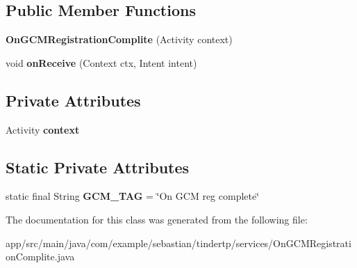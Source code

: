 \subsection*{Public Member Functions}
\begin{DoxyCompactItemize}
\item 
{\bfseries On\+G\+C\+M\+Registration\+Complite} (Activity context)\hypertarget{classcom_1_1example_1_1sebastian_1_1tindertp_1_1services_1_1OnGCMRegistrationComplite_a6d876e990c466642ee4cf26b9d382289}{}\label{classcom_1_1example_1_1sebastian_1_1tindertp_1_1services_1_1OnGCMRegistrationComplite_a6d876e990c466642ee4cf26b9d382289}

\item 
void {\bfseries on\+Receive} (Context ctx, Intent intent)\hypertarget{classcom_1_1example_1_1sebastian_1_1tindertp_1_1services_1_1OnGCMRegistrationComplite_a0a02c2814d8f2a8ace33ab5e7945dde4}{}\label{classcom_1_1example_1_1sebastian_1_1tindertp_1_1services_1_1OnGCMRegistrationComplite_a0a02c2814d8f2a8ace33ab5e7945dde4}

\end{DoxyCompactItemize}
\subsection*{Private Attributes}
\begin{DoxyCompactItemize}
\item 
Activity {\bfseries context}\hypertarget{classcom_1_1example_1_1sebastian_1_1tindertp_1_1services_1_1OnGCMRegistrationComplite_a626c133c839fd05410eff0acb9595256}{}\label{classcom_1_1example_1_1sebastian_1_1tindertp_1_1services_1_1OnGCMRegistrationComplite_a626c133c839fd05410eff0acb9595256}

\end{DoxyCompactItemize}
\subsection*{Static Private Attributes}
\begin{DoxyCompactItemize}
\item 
static final String {\bfseries G\+C\+M\+\_\+\+T\+AG} = \char`\"{}On G\+CM reg complete\char`\"{}\hypertarget{classcom_1_1example_1_1sebastian_1_1tindertp_1_1services_1_1OnGCMRegistrationComplite_a2dd410df225c202d6333b1b91d653684}{}\label{classcom_1_1example_1_1sebastian_1_1tindertp_1_1services_1_1OnGCMRegistrationComplite_a2dd410df225c202d6333b1b91d653684}

\end{DoxyCompactItemize}


The documentation for this class was generated from the following file\+:\begin{DoxyCompactItemize}
\item 
app/src/main/java/com/example/sebastian/tindertp/services/On\+G\+C\+M\+Registration\+Complite.\+java\end{DoxyCompactItemize}
